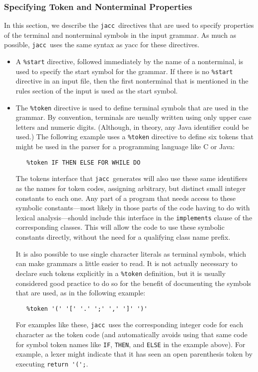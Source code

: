\documentclass[12pt]{article}
\def\jacc{{\tt jacc}}
\begin{document}
\subsubsection{Specifying Token and Nonterminal Properties}
\label{sec-directives-symbols}
In this section, we describe the \jacc\ directives that are used
to specify properties of the terminal and nonterminal symbols in
the input grammar.  As much as possible, \jacc\ uses the same
syntax as yacc for these directives.
\begin{itemize}
\item A \verb"%start" directive, followed immediately by the name
      of a nonterminal, is used to specify the start symbol for the
      grammar.  If there is no \verb"%start" directive in an input
      file, then the first nonterminal that is mentioned in the
      rules section of the input is used as the start symbol.

\item The \verb"%token" directive is used to define terminal symbols
      that are used in the grammar.  By convention, terminals
      are usually written using only upper case letters and
      numeric digits.  (Although, in theory, any Java identifier
      could be used.)  The following example uses a \verb"%token"
      directive to define six tokens that might be used in the
      parser for a programming language like C or Java:
\begin{verbatim}
   %token IF THEN ELSE FOR WHILE DO
\end{verbatim}
      The tokens interface that \jacc\ generates will also use
      these same identifiers as the names for token codes,
      assigning arbitrary, but distinct small integer constants
      to each one.  Any part of a program that needs access
      to these symbolic constants---most likely in those parts
      of the code having to do with lexical analysis---should
      include this interface in the \verb"implements" clause
      of the corresponding classes.  This will allow the code to
      use these symbolic constants directly, without the need
      for a qualifying class name prefix.

      It is also possible to use single character literals as
      terminal symbols, which can make grammars
      a little easier to read.  It is not actually necessary to
      declare such tokens explicitly in a \verb"%token" definition,
      but it is usually considered good practice to do so for the
      benefit of documenting the symbols that are used, as in the
      following example:
\begin{verbatim}
   %token '(' '[' '.' ';' ',' ']' ')'
\end{verbatim}
      For examples like these, \jacc\ uses the corresponding integer
      code for each character as the token code (and automatically
      avoids using that same code for symbol token names like
      \verb"IF", \verb"THEN", and \verb"ELSE" in the example above).
      For example, a lexer might indicate that it has seen an open
      parenthesis token by executing \verb"return '(';".


\end{itemize}
\end{document}
